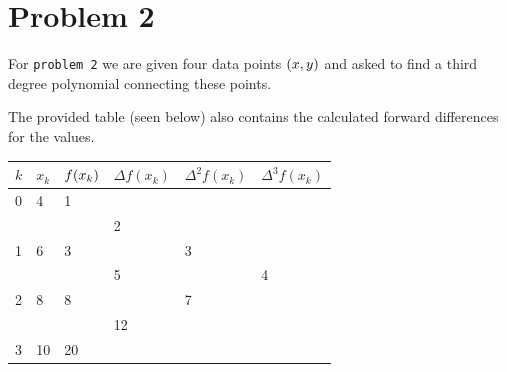 \documentclass[12pt]{article}
\DeclarePairedDelimiter\rb{(}{)}
\begin{document}
\section{Problem 2}
\label{sec:prob2}

For \texttt{problem 2} we are given four data points \(\rb*{x,y}\) and asked to find a third degree polynomial connecting these points. 

The provided table (seen below) also contains the calculated forward differences for the values. 


\begin{table}[h]
\begin{tabular}{llllll}
{\color[HTML]{323232} \(k\)} & {\color[HTML]{323232} \(x_{k}\)} & {\color[HTML]{323232} \(f\rb*{x_{k}}\)} & {\color[HTML]{323232} $\Delta f(x_k)$} & {\color[HTML]{323232} $\Delta ^2 f (x_k)$} & {\color[HTML]{323232} $\Delta ^3 f(x_k)$} \\
\hline
{\color[HTML]{323232} 0} & {\color[HTML]{323232} 4}   & {\color[HTML]{323232} 1}      & {\color[HTML]{323232} }              & {\color[HTML]{323232} }                  & {\color[HTML]{323232} }                 \\
{\color[HTML]{323232} }  & {\color[HTML]{323232} }    & {\color[HTML]{323232} }       & {\color[HTML]{323232} 2}             & {\color[HTML]{323232} }                  & {\color[HTML]{323232} }                 \\
{\color[HTML]{323232} 1} & {\color[HTML]{323232} 6}   & {\color[HTML]{323232} 3}      & {\color[HTML]{323232} }              & {\color[HTML]{323232} 3}                 & {\color[HTML]{323232} }                 \\
{\color[HTML]{323232} }  & {\color[HTML]{323232} }    & {\color[HTML]{323232} }       & {\color[HTML]{323232} 5}             & {\color[HTML]{323232} }                  & {\color[HTML]{323232} 4}                \\
{\color[HTML]{323232} 2} & {\color[HTML]{323232} 8}   & {\color[HTML]{323232} 8}      & {\color[HTML]{323232} }              & {\color[HTML]{323232} 7}                 & {\color[HTML]{323232} }                 \\
{\color[HTML]{323232} }  & {\color[HTML]{323232} }    & {\color[HTML]{323232} }       & {\color[HTML]{323232} 12}            & {\color[HTML]{323232} }                  & {\color[HTML]{323232} }                 \\
{\color[HTML]{323232} 3} & {\color[HTML]{323232} 10}  & {\color[HTML]{323232} 20}     & {\color[HTML]{323232} }              & {\color[HTML]{323232} }                  & {\color[HTML]{323232} }                
\end{tabular}
\end{table}
\end{document}
